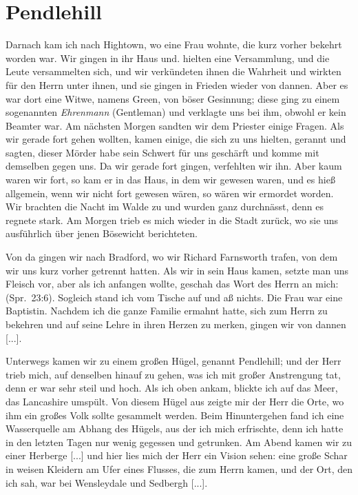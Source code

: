 \section{Pendlehill}

Darnach kam ich nach Hightown, wo eine 
Frau wohnte, die
kurz vorher bekehrt worden war. Wir gingen in ihr Haus und.
hielten eine Versammlung, und die Leute versammelten sich, und
wir verkündeten ihnen die Wahrheit und wirkten für den Herrn
unter ihnen, und sie gingen in Frieden wieder von dannen.
Aber es war dort eine Witwe, namens 
Green, von böser Gesinnung; 
diese ging zu einem sogenannten \textit{Ehrenmann} (Gentleman)
und verklagte uns bei ihm, obwohl er kein Beamter war. Am
nächsten Morgen sandten wir dem Priester einige Fragen. Als
wir gerade fort gehen wollten, kamen einige, die sich zu uns
hielten, gerannt und sagten, dieser Mörder habe sein Schwert
für uns geschärft und komme mit demselben gegen uns. Da wir
gerade fort gingen, verfehlten wir ihn. Aber kaum waren wir
fort, so kam er in das Haus, in dem wir gewesen waren, und
es hieß allgemein, wenn wir nicht fort gewesen wären, so wären
wir ermordet worden. Wir brachten die Nacht im Walde zu
und wurden ganz durchnässt, denn es regnete stark. Am Morgen
trieb es mich wieder in die Stadt zurück, wo sie uns ausführlich
über jenen Bösewicht berichteten.


Von da gingen wir nach Bradford, wo wir 
Richard Farnsworth trafen, von dem wir uns kurz vorher getrennt hatten.
Als wir in sein Haus kamen, setzte man uns Fleisch vor, aber als
ich anfangen wollte, geschah das Wort des Herrn 
an mich: 
(Spr.~23:6). Sogleich stand ich
vom Tische auf und aß nichts. Die Frau war eine 
Baptistin.
Nachdem ich die ganze Familie ermahnt hatte, sich zum Herrn
zu bekehren und auf seine Lehre in ihren Herzen zu merken,
gingen wir von dannen [...].

Unterwegs kamen wir zu einem großen Hügel, genannt 
Pendlehill; und der Herr trieb mich, 
auf denselben hinauf zu gehen,
was ich mit großer Anstrengung tat, denn er war sehr steil und
hoch. Als ich oben ankam, blickte ich auf das Meer, das 
Lancashire umspült. Von diesem Hügel aus 
zeigte mir der Herr
die Orte, wo ihm ein großes Volk sollte gesammelt werden.
Beim Hinuntergehen fand ich eine Wasserquelle am Abhang
des Hügels, aus der ich mich erfrischte, denn ich hatte in den
letzten Tagen nur wenig gegessen und getrunken. Am Abend
kamen wir zu einer Herberge [...] und hier lies mich der
Herr ein Vision sehen: eine große Schar 
in weisen Kleidern
am Ufer eines Flusses, die zum Herrn kamen, und der Ort, den
ich sah, war bei Wensleydale und Sedbergh [...].

